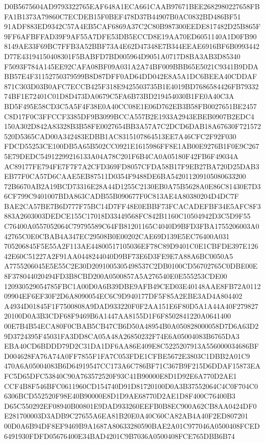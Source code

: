 \documentclass[UTF8,fontset=fandol,zihao=-4,a4paper]{ctexart}
\begin{document}
{{D0B5675604AD9793322765EAF648A1ECA661CAAB97671BEE2682980227658FBFA1B1373A79860C7ECDEB15F0BEF478D37B44907B0AC0832BD486BF51
91ADF883ED9342C57A4EB5CAF6869A37C2C80B987300EEDE817482D25B865F9FF6AFBFFAD39F9AF55A7DFE53DB5ECCD8E19AA70ED6051140A1D0FB90
8149AE33F69BC7FFB3A52BBF73A4E62D47348E7B344EEAE6916BF6B0993442D77E43194150408301F5BABFD7BD005964D9051A0717D8BA3AB3D85340
F5093F784A145EE92CAFA08BF09A031A2A74BF009BBB65E5021C9341B9DDABB57E4F31152750379599B8D87DFF0AD64DD042E8A5A1DC6BEEA40CDDAF
871C303D03B0AFC7ECCB425F318E9425503735B1E4019BD7686584426FB7933274BF1E72401C01D8D473DA0679C5FA6B73BD219454030B1FE0A40C3A
BD5F495E58CD3C5A5F4F38E0A40CC08E1E06D762EB3B58FB0027651BE2457C8D17F0C3FFCCF3385DF9B3099BCCA557B2E1933A2943EBEB0907B2EDC4
150A302D842A83328B3B58FE0027654BB3A57A7C2DCD6DAB18A67630F721572520D5365CAD00A342483EDBB1AC8315107864513EE7A46CFC2F92F030
FDCD55253CE100DB5A65B502CC0921E1615986FF8E1AB00E9276B1F0E9C2675E79DEDC54912299216133A04A78C201F6B4CA0A05180F42FB6F49034A
AC89177FE794FE7F7F7A2CFD369FD8057CFDA58B17F9EB27BA720D25DAB3EB77F0CA57D6CAAE5EB87511D0354F9488DE6BA542011209105080633200
72B6670AB2A19BCD73316E28A44D1255C2130EB0A75B5628A0E86C81430E7D36CF799C9401007BDA863CADB55B090677F0C813AE4A80380204D4DC7F
BAE2CA57BE7B6D777F75BC14D7FF48E0EBBF73FCACADEFBF34E5AFC8F3883A2603003DEDCE155C17018D33449568FC842B1160C10504942D3C5D9F55
C76400A0557052064C79795589C64FB81201165C4040D9BFD3FBA1755206003A042765C0E0CBAB4A347EC29508B0E00202CAE69D139E5EC76400A031
705206845F5E55A2F113AE44800517105036EF78C89D9401C0E1CBFDE397E12642E60C51227A2F91AA0448244040D9BF73E6D3FE9E7A88A6BC0050A5
A7755206045E5E55C2E30D2091005305498537C2DB0100CD56702765C0DBE00E8F378044020494FD3B8CBD200A0500857A5A276540E0E555253CDE00
120930529054785FBC1A00D0A6B39DBE9AFB49CED03E40148AAE8FB72A011209904EF6EF30F2D6A8090054EC6C9D940177DF5F85A2EBE3AD4A804402
A4934D01845F1F7500808A9DAD933220F0F2AA151E6F80D5A1A44A40F27982720100D0A3B3CDF68F9469B6A1447AA8155D1F6F8502841220A0641400
00E7B4B54ECA80F0CBAB5CB47CB6D50A48954B0A050828000058D7D6A63D29D3724395F45031FA3DD8CA05A48A26850232F74E6A05004083B6765DA3
EBA40CD6BDDD79D2C31DA1DF6AA86E409E8C5225207913A556000034686BFD004628FA76A74A0FF7855F1FA7C053FDE1CFBE5672E3803C1DBB2A01C9
470A6A05004083B6D64919547CC173A6C786BF71C367B9F215D6DDAF15873EAFC5D65DFC53840C90A763572520F93C41B90000E8D1D92E6A770D2AE1
CCF4B8F546BFC0611960CD154740D91D81720100D0A3B37552064C4C0F704C06306BCD552520F98E40B90000E8D1D9AE68770D2AE1D8F400C76400B3
D65C550292EF08940B00801E9DAD933260EEFB0B8EC900A62CB8AA0424DF0E281700003D3ADB9C27655A6EA81B20E0A40C60CA82AB4A40F2ED807201
00D0A6B94DF8EF9469B9A1687A80633280590BAE2A01C977046A0500408FCED6491930FDFD05676400E34BAD4201C9B7036A0500408FCE765DBB6B74
}}
\end{document}
